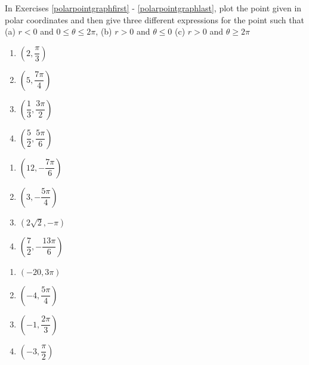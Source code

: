 \documentclass{ximera}
\begin{document}
	\author{Stitz-Zeager}


In Exercises \ref{polarpointgraphfirst} - \ref{polarpointgraphlast}, plot the point given in polar coordinates and then give three different expressions for the point such that \hfill (a) $r < 0$ and $0 \leq \theta \leq 2\pi$, \hfill (b) $r > 0$ and $\theta \leq 0$ \hfill (c) $r > 0$ and $\theta \geq 2\pi$

\begin{multicols}{4}

\begin{enumerate}

\item $\left( 2, \dfrac{\pi}{3} \right)$  \label{polarpointgraphfirst}
\item $\left( 5, \dfrac{7\pi}{4} \right)$
\item $\left( \dfrac{1}{3}, \dfrac{3\pi}{2} \right)$
\item $\left( \dfrac{5}{2}, \dfrac{5\pi}{6} \right)$

\setcounter{HW}{\value{enumi}}

\end{enumerate}

\end{multicols}

\begin{multicols}{4} 

\begin{enumerate}

\setcounter{enumi}{\value{HW}}

\item $\left( 12, -\dfrac{7\pi}{6} \right)$
\item $\left( 3, -\dfrac{5\pi}{4} \right)$
\item $\left( 2\sqrt{2}, -\pi \right)$ 
\item $\left( \dfrac{7}{2}, -\dfrac{13\pi}{6} \right)$

\setcounter{HW}{\value{enumi}}

\end{enumerate}

\end{multicols}

\begin{multicols}{4} 

\begin{enumerate}

\setcounter{enumi}{\value{HW}}

\item $\left( -20, 3\pi \right)$ 
\item $\left( -4, \dfrac{5\pi}{4} \right)$
\item $\left( -1, \dfrac{2\pi}{3} \right)$
\item $\left( -3, \dfrac{\pi}{2} \right)$ 

\setcounter{HW}{\value{enumi}}

\end{enumerate}

\end{multicols}
\end{document}
